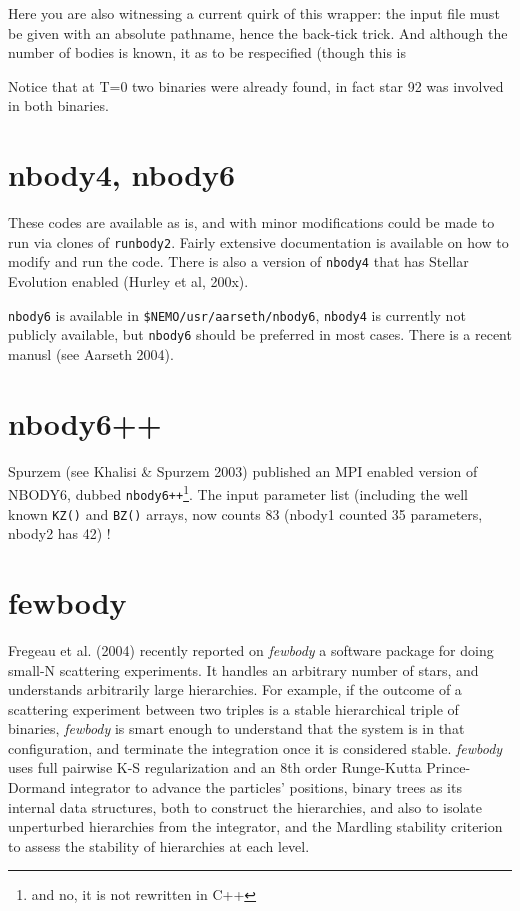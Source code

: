 Here you are also witnessing a current quirk of this wrapper: the input file
must be given with an absolute pathname, hence the back-tick trick. And 
although the number of bodies is known, it as to be respecified (though
this is 

Notice that at T=0 two binaries were already found, in fact star 92 was
involved in both binaries.


% 
% 
% 

\section{nbody4, nbody6}

These codes are available as is, and with minor modifications could be made to run
via clones of {\tt runbody2}. Fairly extensive documentation is available on how
to modify and run the code. There is also a version of {\tt nbody4} that
has Stellar Evolution enabled (Hurley et al, 200x).

{\tt nbody6} is available in {\tt \$NEMO/usr/aarseth/nbody6}, 
{\tt nbody4} is currently not publicly available, but 
{\tt nbody6} should be preferred in most cases. There is a
recent manusl (see Aarseth 2004).


\section{nbody6++}

Spurzem (see Khalisi \& Spurzem 2003) published an MPI enabled version
of NBODY6, dubbed {\tt nbody6++}\footnote{and no, it is not rewritten in C++}.
The input parameter list (including the well known {\tt KZ()} and {\tt BZ()}
arrays, now counts 83  (nbody1 counted 35 parameters, nbody2 has 42) !

\section{fewbody}

Fregeau et al. (2004) recently reported on
{\it fewbody} a software package for doing
small-N scattering experiments. It handles an arbitrary number of stars,
and understands arbitrarily large hierarchies. For example, if the
outcome of a scattering experiment between two triples is a stable
hierarchical triple of binaries, {\it fewbody} is smart enough to
understand that the system is in that configuration, and terminate the
integration once it is considered stable. {\it fewbody} uses full pairwise
K-S regularization and an 8th order Runge-Kutta Prince-Dormand
integrator to advance the particles' positions, binary trees as its
internal data structures, both to construct the hierarchies, and also
to isolate unperturbed hierarchies from the integrator, and the
Mardling stability criterion to assess the stability of hierarchies at
each level.


